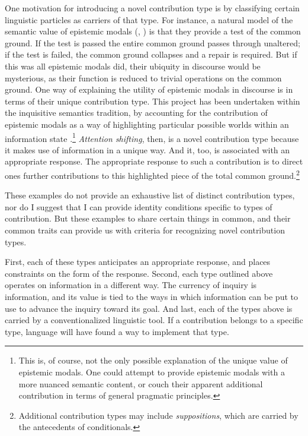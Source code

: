 \documentclass[letterpaper,]{article}
\begin{document}
One motivation for introducing a novel contribution type is by
classifying certain linguistic particles as carriers of that type. For
instance, a natural model of the semantic value of epistemic modals
(\autocite{fintel2010}, \autocite{veltman1996}) is that they provide a
test of the common ground. If the test is passed the entire common
ground passes through unaltered; if the test is failed, the common
ground collapses and a repair is required. But if this was all epistemic
modals did, their ubiquity in discourse would be mysterious, as their
function is reduced to trivial operations on the common ground. One way
of explaining the utility of epistemic modals in discourse is in terms
of their unique contribution type. This project has been undertaken
within the inquisitive semantics tradition, by accounting for the
contribution of epistemic modals as a way of highlighting particular
possible worlds within an information state
\autocite{groenendijk2014}.\footnote{This is, of course, not the only
  possible explanation of the unique value of epistemic modals. One
  could attempt to provide epistemic modals with a more nuanced semantic
  content, or couch their apparent additional contribution in terms of
  general pragmatic principles.} \emph{Attention shifting}, then, is a
novel contribution type because it makes use of information in a unique
way. And it, too, is associated with an appropriate response. The
appropriate response to such a contribution is to direct ones further
contributions to this highlighted piece of the total common
ground.\footnote{Additional contribution types may include
  \emph{suppositions}, which are carried by the antecedents of
  conditionals.}

These examples do not provide an exhaustive list of distinct
contribution types, nor do I suggest that I can provide identity
conditions specific to types of contribution. But these examples to
share certain things in common, and their common traits can provide us
with criteria for recognizing novel contribution types.

First, each of these types anticipates an appropriate response, and
places constraints on the form of the response. Second, each type
outlined above operates on information in a different way. The currency
of inquiry is information, and its value is tied to the ways in which
information can be put to use to advance the inquiry toward its goal.
And last, each of the types above is carried by a conventionalized
linguistic tool. If a contribution belongs to a specific type, language
will have found a way to implement that type.
\end{document}

